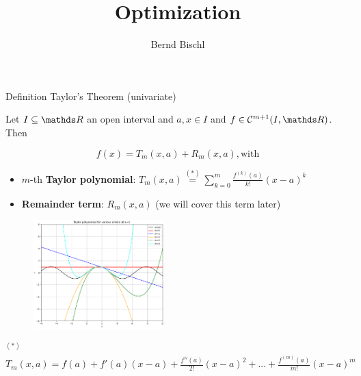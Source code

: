 



\usepackage{graphicx}


\newcommand{\titlefigure}{figure_man/Taylor2D/Taylor2D_1st100.png}
\newcommand{\learninggoals}{
\item Taylor series (Univariate)
\item Hessian Matrix
\item Taylor series (Multivariate)}



\title{Optimization}
\author{Bernd Bischl}
\date{}



\sloppy
   
\begin{vbframe}{Definition Taylor's Theorem (univariate)}

\vspace*{-0.1cm}

Let $I \subseteq \R$ an open interval and $a, x \in I$ and $f \in \mathcal{C}^{m+1}(I,\R)$. Then 

\vspace*{-0.1cm}

$$f(x) = T_{m}(x,a) + R_{m}(x,a), \text{with}$$ 


    \begin{itemize}
      \item $m$-th \textbf{Taylor polynomial}: $T_{m}(x,a) \overset{(*)}{=} \sum_{k=0}^{m} \frac{f^{(k)}(a)}{k!}(x-a)^{k}$ 
      \item \textbf{Remainder term}: $R_m(x, a)$ (we will cover this term later)
    \end{itemize}

\vspace*{-0.3cm}

    \begin{figure}[htp]
        \centering
        \includegraphics[width=0.45\textwidth]{figure_man/taylor_univariate.png}
    \end{figure}

    \begin{footnotesize}
      $^{(*)}$ $T_{m}(x,a) = f(a) + f'(a)(x-a) + \frac{f''(a)}{2!}(x-a)^{2} + ... + \frac{f^{(m)}(a)}{m!} (x - a)^m$
    \end{footnotesize}

    
\end{vbframe}

